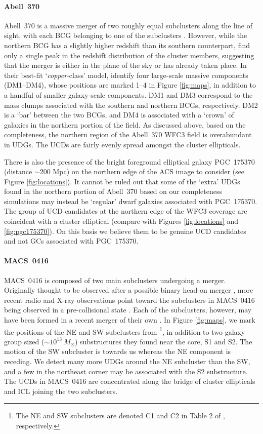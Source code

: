 \documentclass[iop,tighten,twocolumn,apj,floatfix]{emulateapj}
\begin{document}
\paragraph{Abell~370} Abell~370 is a massive merger of two roughly equal
subclusters along the line of sight, with each BCG belonging to one of the
subclusters \citep{richard2010}.
However, while the northern BCG has a slightly higher redshift than its southern counterpart,
\cite{lagattuta2019} find only a single peak in the redshift distribution of
the cluster members, suggesting that the merger is either in the plane of the
sky or has already taken place.
In their best-fit `\textit{copper}-class' model, \cite{lagattuta2019} identify
four large-scale massive components (DM1--DM4), whose positions are marked
1--4 in Figure \ref{fig:maps}, in addition to a handful of smaller galaxy-scale components. 
DM1 and DM3 correspond to the mass clumps associated with the southern and
northern BCGs, respectively. DM2 is a `bar' between the two BCGs, and DM4 is
associated with a `crown' of galaxies in the northern portion of the field.
As discussed above, based on the completeness, the northern region of the
Abell~370 WFC3 field is overabundant in UDGs.
The UCDs are fairly evenly spread amongst the cluster ellipticals.

There is also the presence of the bright foreground elliptical galaxy
PGC~175370 (distance ${\sim}200$ Mpc) on the northern edge of the ACS image to
consider (see Figure \ref{fig:locations}).
It cannot be ruled out that some of the `extra' UDGs found in the northern
portion of Abell~370 based on our completeness simulations may instead be
`regular' dwarf galaxies associated with PGC~175370.
The group of UCD candidates at the northern edge of the WFC3 coverage are
coincident with a cluster elliptical (compare with Figures \ref{fig:locations}
and \ref{fig:pgc175370}).
On this basis we believe them to be genuine UCD candidates and not GCs
associated with PGC~175370.

\paragraph{MACS~0416} MACS~0416 is composed of two main subclusters undergoing
a merger.  Originally thought to be observed after a possible binary head-on
merger \citep{mann2012, jauzac2015}, more recent radio and X-ray observations
point toward the subclusters in MACS~0416 being observed in a pre-collisional
state \citep{ogrean2015, balestra2016}. Each of the subclusters, however, may
have been formed in a recent merger of their own \citep{balestra2016}.
In Figure \ref{fig:maps}, we mark the positions of the NE and SW subclusters from
\cite{jauzac2015}\footnote{The NE and SW subclusters are denoted C1 and C2 in
Table 2 of \cite{jauzac2015}, respectively.}, in addition to two galaxy group sized
(${\sim}10^{13}~M_{\odot}$) substructures they found near the core, S1 and S2. The motion
of the SW subcluster is towards us whereas the NE component is receding.
We detect many more UDGs around the NE subcluster than the SW, and a few in
the northeast corner may be associated with the S2 substructure.
The UCDs in MACS~0416 are concentrated along the bridge of cluster ellipticals
and ICL joining the two subclusters.
\end{document}

